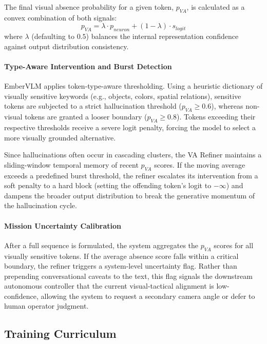\documentclass[runningheads]{llncs}
\begin{document}
The final visual absence probability for a given token, $p_{VA}$, is calculated as a convex combination of both signals:
\begin{equation}
    p_{VA} = \lambda \cdot p_{neuron} + (1 - \lambda) \cdot s_{logit}
\end{equation}
where $\lambda$ (defaulting to $0.5$) balances the internal representation confidence against output distribution consistency.

\paragraph{Type-Aware Intervention and Burst Detection}
 EmberVLM applies token-type-aware thresholding. Using a heuristic dictionary of visually sensitive keywords (e.g., objects, colors, spatial relations), sensitive tokens are subjected to a strict hallucination threshold ($p_{VA} \geq 0.6$), whereas non-visual tokens are granted a looser boundary ($p_{VA} \geq 0.8$). Tokens exceeding their respective thresholds receive a severe logit penalty, forcing the model to select a more visually grounded alternative.

Since hallucinations often occur in cascading clusters, the VA Refiner maintains a sliding-window temporal memory of recent $p_{VA}$ scores. If the moving average exceeds a predefined burst threshold, the refiner escalates its intervention from a soft penalty to a hard block (setting the offending token's logit to $-\infty$) and dampens the broader output distribution to break the generative momentum of the hallucination cycle.

\paragraph{Mission Uncertainty Calibration}
After a full sequence is formulated, the system aggregates the $p_{VA}$ scores for all visually sensitive tokens. If the average absence score falls within a critical boundary, the refiner triggers a system-level uncertainty flag. Rather than prepending conversational caveats to the text, this flag signals the downstream autonomous controller that the current visual-tactical alignment is low-confidence, allowing the system to request a secondary camera angle or defer to human operator judgment.

\subsection{Training Curriculum}
\label{sec:training}
\end{document}
